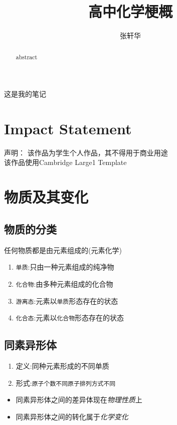 \documentclass[
  journal=large,
  manuscript=物质及其变化,
  year=2020,
  volume=37,
]{cup-journal}
\title{高中化学梗概}
\author{张轩华}
\affiliation{First Division, 宁海海亮学校, 宁波, 315600, 浙江, 中国}
\begin{document}
\maketitle
\tableofcontents
\CUPTWOCOL 

\begin{abstract}
abstract
\end{abstract}

\noindent  这是我的笔记

\section*{Impact Statement}

声明：
该作品为学生个人作品，其不得用于商业用途\\
该作品使用Cambridge Large1 Template
\section{物质及其变化}

\subsection{物质的分类}
    任何物质都是由元素组成的(元素化学)
\begin{enumerate}
    \item \verb|单质|:只由一种元素组成的纯净物
    \item \verb|化合物|:由多种元素组成的化合物
    \item \verb|游离态|:元素以\texttt{单质}形态存在的状态
    \item \verb|化合态|:元素以\texttt{化合物}形态存在的状态
    

\end{enumerate}

\subsection{同素异形体}
    \begin{enumerate}
            \item 定义:同种元素形成的不同单质
            \item 形式:\verb|原子个数不同|\verb|原子排列方式不同|
    \end{enumerate}

    \begin{itemize}
    \item 同素异形体之间的差异体现在\emph{物理性质}上
    \item 同素异形体之间的转化属于\emph{化学变化}
    \end{itemize} 
\end{document}
